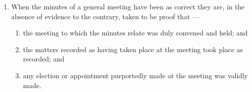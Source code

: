 \documentclass[../constitution.tex]{subfiles}
\begin{document}
\begin{enumerate}

\item When the minutes of a general meeting have been   as correct they are, in the absence of evidence to the contrary, taken to be proof that ---

  \begin{enumerate}
  
  \item the meeting to which the minutes relate was duly convened and held; and
  \item the matters recorded as having taken place at the meeting took place as recorded; and
  \item any election or appointment purportedly made at the meeting was validly made.
  \end{enumerate}
\end{enumerate}
\end{document}
